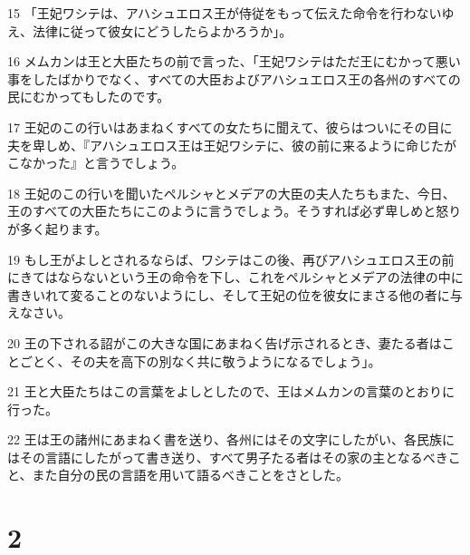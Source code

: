 \par 15 「王妃ワシテは、アハシュエロス王が侍従をもって伝えた命令を行わないゆえ、法律に従って彼女にどうしたらよかろうか」。
\par 16 メムカンは王と大臣たちの前で言った、「王妃ワシテはただ王にむかって悪い事をしたばかりでなく、すべての大臣およびアハシュエロス王の各州のすべての民にむかってもしたのです。
\par 17 王妃のこの行いはあまねくすべての女たちに聞えて、彼らはついにその目に夫を卑しめ、『アハシュエロス王は王妃ワシテに、彼の前に来るように命じたがこなかった』と言うでしょう。
\par 18 王妃のこの行いを聞いたペルシャとメデアの大臣の夫人たちもまた、今日、王のすべての大臣たちにこのように言うでしょう。そうすれば必ず卑しめと怒りが多く起ります。
\par 19 もし王がよしとされるならば、ワシテはこの後、再びアハシュエロス王の前にきてはならないという王の命令を下し、これをペルシャとメデアの法律の中に書きいれて変ることのないようにし、そして王妃の位を彼女にまさる他の者に与えなさい。
\par 20 王の下される詔がこの大きな国にあまねく告げ示されるとき、妻たる者はことごとく、その夫を高下の別なく共に敬うようになるでしょう」。
\par 21 王と大臣たちはこの言葉をよしとしたので、王はメムカンの言葉のとおりに行った。
\par 22 王は王の諸州にあまねく書を送り、各州にはその文字にしたがい、各民族にはその言語にしたがって書き送り、すべて男子たる者はその家の主となるべきこと、また自分の民の言語を用いて語るべきことをさとした。

\chapter{2}


